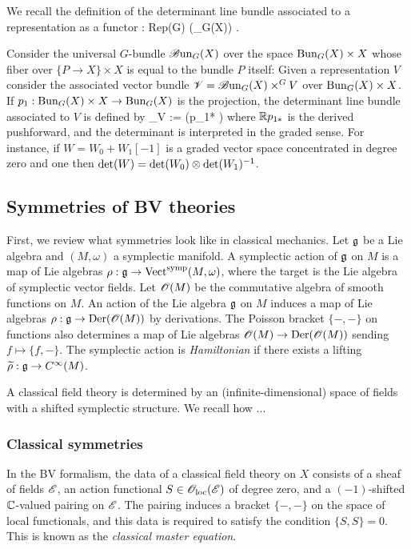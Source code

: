 We recall the definition of the determinant line bundle associated to a representation as a functor
\ben
\kappa : {\rm Rep}(G) (\Bun_G(X)) .
\een

Consider the universal $G$-bundle $\mathscr B {\rm un}_G(X)$ over the space ${\rm Bun}_G(X) \times X$ whose fiber over $\{P \to X\} \times X$ is equal to the bundle $P$ itself:
\ben
{}
\een
Given a representation $V$ consider the associated vector bundle $\mathscr V = \mathscr B {\rm un}_G(X) \times^G V$ over ${\rm Bun}_G(X) \times X$. 
If $p_1 : {\rm Bun}_G(X) \times X \to {\rm Bun}_G(X)$ is the projection, the determinant line bundle associated to $V$ is defined by
\ben
\kappa_V := \det (\RR p_{1*} \sV)
\een
where $\mathbb R p_{1*}$ is the derived pushforward, and the determinant is interpreted in the graded sense.
For instance, if $W = W_0 + W_1 [-1]$ is a graded vector space concentrated in degree zero and one then $\det(W) = \det(W_0) \otimes \det(W_1)^{-1}$.

\subsection{Symmetries of BV theories}

First, we review what symmetries look like in classical mechanics. 
Let $\mathfrak g$ be a Lie algebra and $(M, \omega)$ a symplectic manifold. 
A symplectic action of $\mathfrak g$ on $M$ is a map of Lie algebras $\rho : \mathfrak g \to {\rm Vect}^{\rm symp}(M, \omega)$, where the target is the Lie algebra of symplectic vector fields. 
Let $\mathscr O(M)$ be the commutative algebra of smooth functions on $M$.
An action of the Lie algebra $\mathfrak g$ on $M$ induces a map of Lie algebras $\rho : \mathfrak g \to {\rm Der}(\mathscr O(M))$ by derivations. 
The Poisson bracket $\{-,-\}$ on functions also determines a map of Lie algebras $\mathscr O(M) \to {\rm Der}(\mathscr O(M))$ sending $f \mapsto \{f,-\}$. 
The symplectic action is {\em Hamiltonian} if there exists a lifting $\widetilde{\rho} : \mathfrak g \to C^\infty(M)$.

A classical field theory is determined by an (infinite-dimensional) space of fields with a shifted symplectic structure. 
We recall how ...

\subsubsection{Classical symmetries}

In the BV formalism, the data of a classical field theory on $X$ consists of a sheaf of fields $\mathscr E$, an action functional $S \in {\mathscr O}_{\rm loc}(\mathscr E)$ of degree zero, and a $(-1)$-shifted $\mathbb C$-valued pairing on $\mathscr E$. 
The pairing induces a bracket $\{-,-\}$ on the space of local functionals, and this data is required to satisfy the condition $\{S,S\} = 0$.
This is known as the {\em classical master equation}. 

